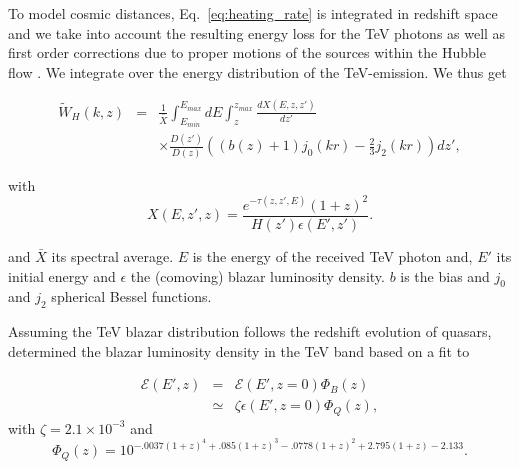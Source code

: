 \documentclass[twocolumns]{emulateapj}
\newcommand\Pc[1]{{\color{cyan} \bf #1}} %
\begin{document}
 To model cosmic distances, Eq.~\ref{eq:heating_rate} is integrated in redshift space and we take into account the resulting energy loss for the TeV photons as well as first order corrections due to proper motions of the sources within the Hubble flow \citep{1987MNRAS.227....1K}. We integrate over the energy distribution of the TeV-emission. We thus get

\begin{eqnarray}
  \label{eq:window}
  \tilde{W}_H(k,z)&=&\frac{1}{\bar{X}}\int_{E_{min}}^{E_{max}}dE\int_z^{z_{max}}\frac{dX(E,z,z')}{dz'} \\ 
&&\times \frac{D(z')}{D(z)}\left((b(z)+1)j_0(kr)-\frac{2}{3}j_2(kr)\right)dz', \nonumber
\end{eqnarray}

with 
 \begin{equation}
  \label{eq:define_X}
  X(E,z',z)=\frac{e^{-\tau(z,z',E)}(1+z)^2}{H(z')\epsilon(E',z')}.
\end{equation}

and $\bar{X}$ its spectral average. $E$ is the energy of the received TeV photon and, $E'$ its initial energy and  $\epsilon$ the (comoving) blazar luminosity density. $b$ is the bias and $j_0$ and $j_2$ spherical Bessel functions.


Assuming the TeV blazar distribution follows the redshift evolution of quasars, \citet{2012ApJ...752...22B} determined the blazar luminosity density in the TeV band based on a fit to \citet{2007ApJ...654..731H}

\begin{eqnarray}
  \label{eq:mean_heat}
  \mathcal{E}(E',z)&=&\mathcal{E}(E',z=0)\Phi_{B}(z)\\ \nonumber
&\simeq& \zeta\epsilon(E',z=0)\Phi_{Q}(z),
\end{eqnarray}
with $\zeta=2.1\times 10^{-3}$ and
\begin{equation}
  \label{eq:phi_quasar}
 \Phi_{Q}(z)=10^{-.0037(1+z)^4+.085(1+z)^3-.0778(1+z)^2+2.795(1+z)-2.133}. 
\end{equation}
 
\end{document}
